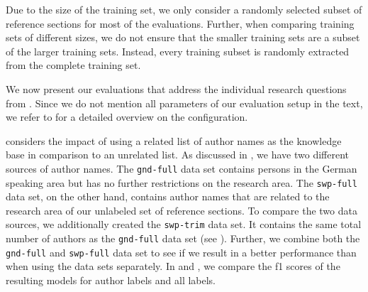 Due to the size of the training set, we only consider a randomly selected subset of reference sections for most of the evaluations.
Further, when comparing training sets of different sizes, we do not ensure that the smaller training sets are a subset of the larger training sets.
Instead, every training subset is randomly extracted from the complete training set.

We now present our evaluations that address the individual research questions from .
Since we do not mention all parameters of our evaluation setup in the text, we refer to  for a detailed overview on the configuration.

\bigskip

 considers the impact of using a related list of author names as the knowledge base in comparison to an unrelated list.
As discussed in , we have two different sources of author names.
The \texttt{gnd-full} data set contains persons in the German speaking area but has no further restrictions on the research area.
The \texttt{swp-full} data set, on the other hand, contains author names that are related to the research area of our unlabeled set of reference sections.
To compare the two data sources, we additionally created the \texttt{swp-trim} data set.
It contains the same total number of authors as the \texttt{gnd-full} data set (see ).
Further, we combine both the \texttt{gnd-full} and \texttt{swp-full} data set to see if we result in a better performance than when using the data sets separately.
In  and , we compare the \glspl{f1 score} of the resulting models for author labels and all labels.
